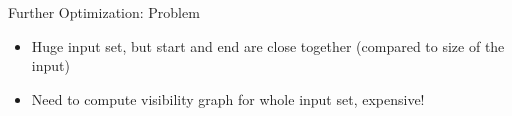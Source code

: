 \begin{frame}[t]{Further Optimization: Problem}

\begin{itemize}
    \item Huge input set, but start and end are close together (compared to size of the input)
    \item Need to compute visibility graph for whole input set, expensive!
\end{itemize}

\vspace{2em}

\begin{center}
%
%
\end{center}
\end{frame}

